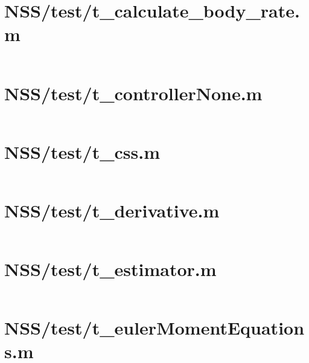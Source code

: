 \section*{NSS/test/t\_calculate\_body\_rate.m}\label{code:NSS/test/t_calculate_body_rate.m}
\inputminted[linenos,fontsize=\scriptsize]{matlab}{/home/dcouture/git/mathyourlife/TSatPy/beta_versions/matlab_object_oriented/test/t_calculate_body_rate.m}

\pagebreak
\section*{NSS/test/t\_controllerNone.m}\label{code:NSS/test/t_controllerNone.m}
\inputminted[linenos,fontsize=\scriptsize]{matlab}{/home/dcouture/git/mathyourlife/TSatPy/beta_versions/matlab_object_oriented/test/t_controllerNone.m}

\pagebreak
\section*{NSS/test/t\_css.m}\label{code:NSS/test/t_css.m}
\inputminted[linenos,fontsize=\scriptsize]{matlab}{/home/dcouture/git/mathyourlife/TSatPy/beta_versions/matlab_object_oriented/test/t_css.m}

\pagebreak
\section*{NSS/test/t\_derivative.m}\label{code:NSS/test/t_derivative.m}
\inputminted[linenos,fontsize=\scriptsize]{matlab}{/home/dcouture/git/mathyourlife/TSatPy/beta_versions/matlab_object_oriented/test/t_derivative.m}

\pagebreak
\section*{NSS/test/t\_estimator.m}\label{code:NSS/test/t_estimator.m}
\inputminted[linenos,fontsize=\scriptsize]{matlab}{/home/dcouture/git/mathyourlife/TSatPy/beta_versions/matlab_object_oriented/test/t_estimator.m}

\pagebreak
\section*{NSS/test/t\_eulerMomentEquations.m}\label{code:NSS/test/t_eulerMomentEquations.m}
\inputminted[linenos,fontsize=\scriptsize]{matlab}{/home/dcouture/git/mathyourlife/TSatPy/beta_versions/matlab_object_oriented/test/t_eulerMomentEquations.m}

